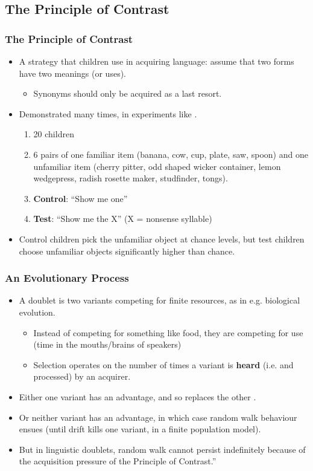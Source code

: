 \documentclass[hyperref={pdfpagelabels=false}]{beamer}
\begin{document}
\subsection{The Principle of Contrast}
\begin{frame}
\frametitle{The Principle of Contrast}
\begin{itemize}
	\item A strategy that children use in acquiring language: assume that two forms have two meanings (or uses).
		\begin{itemize} \item Synonyms should only be acquired as a last resort.\end{itemize}
	\item Demonstrated many times, in experiments like \citet{markmanwachtel1988}.
		\begin{enumerate}
			\item 20 children
			\item 6 pairs of one familiar item (banana, cow, cup, plate, saw, spoon) and one unfamiliar item (cherry pitter, odd shaped wicker container, lemon wedgepress, radish rosette maker, studfinder, tongs).
			\item \textbf{Control}: ``Show me one''
			\item \textbf{Test}: ``Show me the X'' (X = nonsense syllable)
		\end{enumerate}
	\item Control children pick the unfamiliar object at chance levels, but test children choose unfamiliar objects significantly higher than chance.
\end{itemize}
\end{frame}


\begin{frame}
\frametitle{An Evolutionary Process}
\begin{itemize}
	\item A doublet is two variants competing for finite resources, as in e.g. biological evolution.
		\begin{itemize} \item Instead of competing for something like food, they are competing for use (time in the mouths/brains of speakers) 
					\item Selection operates on the number of times a variant is \textbf{heard} (i.e. and processed) by an acquirer. \end{itemize}
	\item Either one variant has an advantage, and so replaces the other \citep[following a logistic function;][]{nowak2006}.
	\item Or neither variant has an advantage, in which case random walk behaviour ensues (until drift kills one variant, in a finite population model).
	\item But in linguistic doublets, random walk cannot persist indefinitely because of the acquisition pressure of the Principle of Contrast.''
\end{itemize}
\end{frame}
\end{document}
